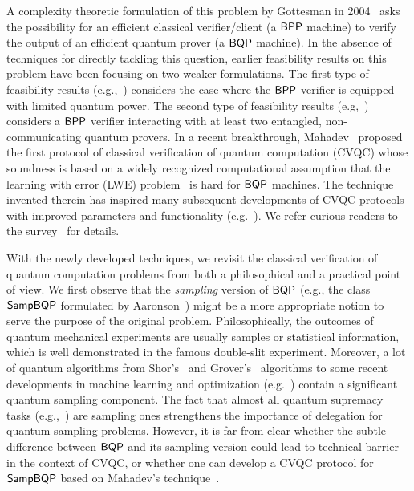 A complexity theoretic formulation of this problem by Gottesman in 2004~\cite{web:Aaronson} asks the possibility for an efficient classical verifier/client (a $\operatorname{\mathsf{BPP}}$ machine) to verify the output of an
efficient quantum prover (a $\operatorname{\mathsf{BQP}}$ machine).
In the absence of techniques for directly tackling this question, earlier feasibility results on this problem have been focusing on two weaker formulations.
The first type of feasibility results (e.g.,~\cite{BFK09,arXiv:ABOEM17,FK17,mf16}) considers the case where the $\operatorname{\mathsf{BPP}}$ verifier is equipped with limited quantum power.
The second type of feasibility results (e.g,~\cite{Nat:RUV13, CGJV19, Gheorghiu_2015, HPF15})
considers a $\operatorname{\mathsf{BPP}}$ verifier interacting with at least two entangled, non-communicating quantum provers.
In a recent breakthrough, Mahadev~\cite{FOCS:Mahadev18a} proposed the first protocol of classical verification of quantum computation (CVQC) whose soundness is based on a widely recognized computational assumption that the learning with error (LWE) problem~\cite{JACM:Regev09} is hard for $\operatorname{\mathsf{BQP}}$ machines.
The technique invented therein has inspired many  subsequent developments of CVQC protocols with improved parameters and functionality (e.g.~\cite{FOCS:GheVid19,arXiv:AlaChiHun19,arXiv:ChiaChungYam19}).
We refer curious readers to the survey~\cite{survey:GKK19} for details.

With the newly developed techniques, we revisit the classical verification of quantum computation problems from both a philosophical and a practical point of view.
We first observe that the \emph{sampling} version of $\operatorname{\mathsf{BQP}}$ (e.g., the class $\operatorname{\mathsf{SampBQP}}$ formulated by Aaronson~\cite{aaronson_2013}) might be a more appropriate notion to serve the purpose of the original problem.
Philosophically, the outcomes of quantum mechanical experiments are usually samples or statistical information, which is well demonstrated in the famous double-slit experiment.
Moreover, a lot of quantum algorithms from Shor's~\cite{Shor} and Grover's~\cite{Grover} algorithms to some recent developments in machine learning and optimization (e.g.~\cite{brando_et_al:LIPIcs:2019:10603, AGGW17,pmlr-v97-li19b}) contain a significant quantum sampling component.
The fact that almost all quantum supremacy tasks (e.g.,~\cite{Boson, IQP, nature-google}) are sampling ones strengthens the importance of delegation for quantum sampling problems.
However, it is far from clear whether the subtle difference between $\operatorname{\mathsf{BQP}}$ and its sampling version could lead to
technical barrier in the context of CVQC, or
whether one can develop a CVQC protocol for $\operatorname{\mathsf{SampBQP}}$ based on Mahadev's technique~\cite{FOCS:Mahadev18a}.

